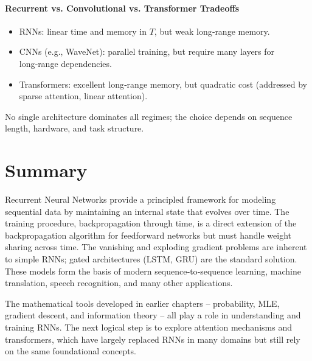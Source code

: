 \documentclass{tufte-handout}
\begin{document}
\paragraph{Recurrent vs. Convolutional vs. Transformer Tradeoffs}
\begin{itemize}
    \item RNNs: linear time and memory in $T$, but weak long‑range memory.
    \item CNNs (e.g., WaveNet): parallel training, but require many layers for long‑range dependencies.
    \item Transformers: excellent long‑range memory, but quadratic cost (addressed by sparse attention, linear attention).
\end{itemize}
No single architecture dominates all regimes; the choice depends on sequence length, hardware, and task structure.


\section{Summary}

Recurrent Neural Networks provide a principled framework for modeling sequential data by maintaining an internal state that evolves over time. The training procedure, backpropagation through time, is a direct extension of the backpropagation algorithm for feedforward networks but must handle weight sharing across time. The vanishing and exploding gradient problems are inherent to simple RNNs; gated architectures (LSTM, GRU) are the standard solution. These models form the basis of modern sequence‑to‑sequence learning, machine translation, speech recognition, and many other applications.

The mathematical tools developed in earlier chapters – probability, MLE, gradient descent, and information theory – all play a role in understanding and training RNNs. The next logical step is to explore attention mechanisms and transformers, which have largely replaced RNNs in many domains but still rely on the same foundational concepts.
\end{document}
